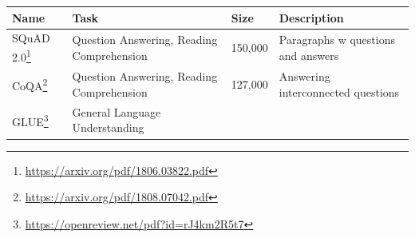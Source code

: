 \documentclass[]{krantz}
\renewcommand{\href}[2]{#2\footnote{\url{#1}}}
\begin{document}
\begin{longtable}[]{@{}llll@{}}
\toprule
\begin{minipage}[b]{0.31\columnwidth}\raggedright
Name\strut
\end{minipage} & \begin{minipage}[b]{0.24\columnwidth}\raggedright
Task\strut
\end{minipage} & \begin{minipage}[b]{0.10\columnwidth}\raggedright
Size\strut
\end{minipage} & \begin{minipage}[b]{0.23\columnwidth}\raggedright
Description\strut
\end{minipage}\tabularnewline
\midrule
\endhead
\begin{minipage}[t]{0.31\columnwidth}\raggedright
\href{https://arxiv.org/pdf/1806.03822.pdf}{SQuAD 2.0}\strut
\end{minipage} & \begin{minipage}[t]{0.24\columnwidth}\raggedright
Question Answering, Reading Comprehension\strut
\end{minipage} & \begin{minipage}[t]{0.10\columnwidth}\raggedright
150,000\strut
\end{minipage} & \begin{minipage}[t]{0.23\columnwidth}\raggedright
Paragraphs w questions and answers\strut
\end{minipage}\tabularnewline
\begin{minipage}[t]{0.31\columnwidth}\raggedright
\href{https://arxiv.org/pdf/1808.07042.pdf}{CoQA}\strut
\end{minipage} & \begin{minipage}[t]{0.24\columnwidth}\raggedright
Question Answering, Reading Comprehension\strut
\end{minipage} & \begin{minipage}[t]{0.10\columnwidth}\raggedright
127,000\strut
\end{minipage} & \begin{minipage}[t]{0.23\columnwidth}\raggedright
Answering interconnected questions\strut
\end{minipage}\tabularnewline
\begin{minipage}[t]{0.31\columnwidth}\raggedright
\href{https://openreview.net/pdf?id=rJ4km2R5t7}{GLUE}\strut
\end{minipage} & \begin{minipage}[t]{0.24\columnwidth}\raggedright
General Language Understanding\strut

\end{minipage}
\end{longtable}
\end{document}
